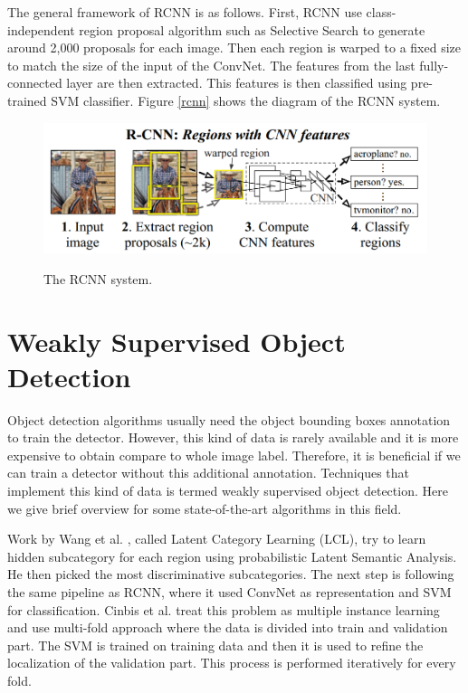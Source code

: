 \documentclass[a4paper,11pt]{kth-mag}
\begin{document}
The general framework of RCNN is as follows. First, RCNN use class-independent region proposal algorithm such as Selective Search to generate around 2,000 proposals for each image. Then each region is warped to a fixed size to match the size of the input of the ConvNet. The features from the last fully-connected layer are then extracted. This features is then classified using pre-trained SVM classifier. Figure \ref{rcnn} shows the diagram of the RCNN system.

\begin{figure}[h]
\centering
\includegraphics[scale=0.5]{image/rcnn.png}
\label{fig:rcnn}
\caption{The RCNN system.}
\end{figure}

\section{Weakly Supervised Object Detection}
Object detection algorithms usually need the object bounding boxes annotation to train the detector. However, this kind of data is rarely available and it is more expensive to obtain compare to whole image label. Therefore, it is beneficial if we can train a detector without this additional annotation. Techniques that implement this kind of data is termed weakly supervised object detection. Here we give brief overview for some state-of-the-art algorithms in this field.

Work by Wang et al. \cite{wang2014lcl}, called Latent Category Learning (LCL), try to learn hidden subcategory for each region using probabilistic Latent Semantic Analysis. He then picked the most discriminative subcategories. The next step is following the same pipeline as RCNN, where it used ConvNet as representation and SVM for classification.
Cinbis et al. \cite{cinbis2014mil} treat this problem as multiple instance learning and use multi-fold approach where the data is divided into train and validation part. The SVM is trained on training data and then it is used to refine the localization of the validation part. This process is performed iteratively for every fold.
\end{document}
